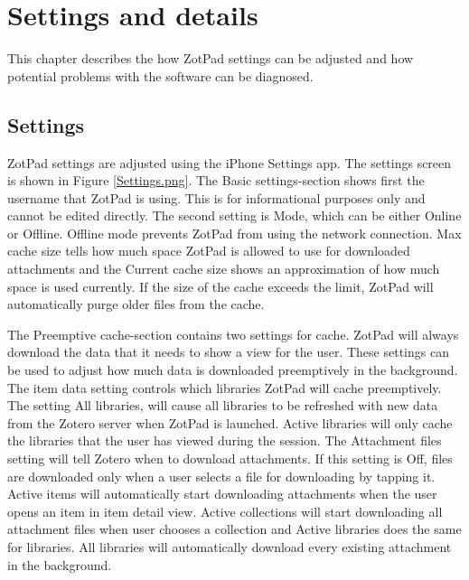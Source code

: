\documentclass[oneside, openany, 12pt]{tufte-book}
\newcommand{\iphone}[1]{#1}
\newcommand{\ipad}[1]{}
\newcommand{\image}[2]{
	\center
	\fbox{\texttt{[image: images/iPhone/\{\#2]}}}

	\refstepcounter{figure}
	\smallskip\noindent\small Figure \thefigure: #1
	\label{#2}
	}
\newcommand{\iphone}[1]{}
\newcommand{\ipad}[1]{#1}
\newcommand{\image}[2]{
	\caption{#1}
	\label{#2}
	\fbox{\texttt{[image: images/iPad/\{\#2]}}}
	}
\begin{document}
\begin{figure}
\image{Conflict resolution}{Conflict.png}
\end{figure}

\clearpage

\chapter{Settings and details}

This chapter describes the how ZotPad settings can be adjusted and how potential problems with the software can be diagnosed.

\section{Settings}

ZotPad settings are adjusted using the \ipad{iPad}\iphone{iPhone} Settings app. The settings screen is shown in Figure \ref{Settings.png}. The Basic settings-section shows first the username that ZotPad is using. This is for informational purposes only and cannot be edited directly. The second setting is Mode, which can be either Online or Offline. Offline mode prevents ZotPad from using the network connection. Max cache size tells how much space ZotPad is allowed to use for downloaded attachments and the Current cache size shows an approximation of how much space is used currently. If the size of the cache exceeds the limit, ZotPad will automatically purge older files from the cache.

\begin{figure}
\image{ZotPad settings}{Settings.png}
\end{figure}

The Preemptive cache-section contains two settings for cache. ZotPad will always download the data that it needs to show a view for the user. These settings can be used to adjust how much data is downloaded preemptively in the background. The item data setting controls which libraries ZotPad will cache preemptively. The setting All libraries, will cause all libraries to be refreshed with new data from the Zotero server when ZotPad is launched. Active libraries will only cache the libraries that the user has viewed during the session. The Attachment files setting will tell Zotero when to download attachments. If this setting is Off, files are downloaded only when a user selects a file for downloading by tapping it. Active items will automatically start downloading attachments when the user opens an item in item detail view. Active collections will start downloading all attachment files when user chooses a collection and Active libraries does the same for libraries. All libraries will automatically download every existing attachment in the background.
\end{document}
